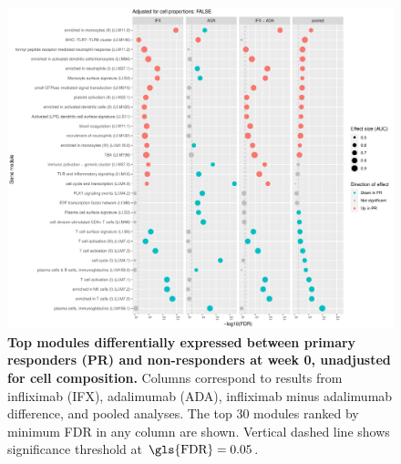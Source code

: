 \begin{figure}
    \centering
    \includegraphics[width=1.0\textwidth,page=1]{mainmatter/figures/chapter_04/plot_gene_set_enrichment.tmodCERNO_panelplot_reversed_C_1RI_1NI,C_1RA_1NA,C_(1RI_1NI)_(1RA_1NA),C_1R_1N.cell_prop_correction_FALSE.pdf}
    \caption{
        \textbf{Top modules differentially expressed between primary responders (PR) and non-responders at week 0, unadjusted for cell composition.}
        Columns correspond to results from infliximab (IFX), adalimumab (ADA), infliximab minus adalimumab difference, and pooled analyses. 
        The top 30 modules ranked by minimum \gls{FDR} in any column are shown. Vertical dashed line shows significance threshold at $\text{\gls{FDR}} = 0.05$.
    }
    \label{fig:multipants_dge_panelPlot_week_0_R_N_cellPropF}
\end{figure}

